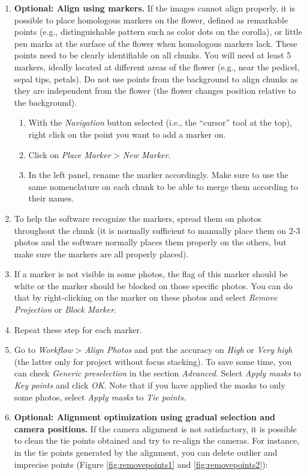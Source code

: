 \documentclass[
]{book}
\begin{document}
\begin{enumerate}
\def\labelenumi{\arabic{enumi}.}
\setcounter{enumi}{4}
\item
  \textbf{Optional: Align using markers.} If the images cannot
  align properly, it is possible to place homologous markers on the flower,
  defined as remarkable points (e.g., distinguishable pattern such as color dots
  on the corolla), or little pen marks at the surface of the
  flower when homologous markers lack. These points need to be
  clearly identifiable on all chunks. You will need at least 5 markers, ideally
  located at different areas of the flower
  (e.g., near the pedicel, sepal tips, petals). Do not use points
  from the background to align chunks as they are independent from the
  flower (the flower changes position relative to the background).

  \begin{enumerate}
  \def\labelenumii{\arabic{enumii}.}
  \item
    With the \emph{Navigation} button selected (i.e., the ``cursor'' tool at the
    top), right click on the point you want to add a marker on.
  \item
    Click on \emph{Place Marker} \textgreater{} \emph{New Marker}.
  \item
    In the left panel, rename the marker accordingly. Make sure to use the
    same nomenclature on each chunk to be able to merge them
    according to their names.
  \end{enumerate}
\item
  To help the software recognize the markers, spread them on photos throughout
  the chunk (it is normally sufficient to manually place them on 2-3 photos and the software
  normally places them properly on the others, but make sure the markers are all
  properly placed).
\item
  If a marker is not visible in some photos, the flag of this marker should be
  white or the marker should be blocked on those specific photos. You can do
  that by right-clicking on the marker on these photos and select \emph{Remove Projection}
  or \emph{Block Marker}.
\item
  Repeat these step for each marker.
\item
  Go to \emph{Workflow} \textgreater{} \emph{Align Photos} and put the accuracy on \emph{High} or
  \emph{Very high} (the latter only for project without focus stacking). To save some time,
  you can check \emph{Generic preselection} in the section \emph{Advanced}.
  Select \emph{Apply masks} to \emph{Key points} and click \emph{OK}. Note that if you
  have applied the masks to only some photos, select \emph{Apply masks} to \emph{Tie points}.
\item
  \textbf{Optional: Alignment optimization using gradual selection and camera positions.}
  If the camera alignment is not satisfactory, it is possible to clean the tie
  points obtained and try to re-align the cameras. For instance, in the tie points
  generated by the alignment, you can delete outlier and imprecise points
  (Figure \ref{fig:removepoints1} and \ref{fig:removepoints2}):


\end{enumerate}
\end{document}
